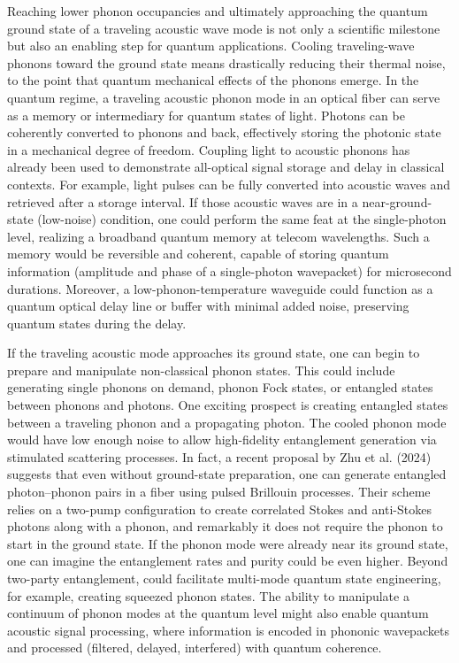 Reaching lower phonon occupancies and ultimately approaching the quantum ground state of a traveling acoustic wave mode is not only a scientific milestone but also an enabling step for quantum applications. Cooling traveling-wave phonons toward the ground state means drastically reducing their thermal noise, to the point that quantum mechanical effects of the phonons emerge. In the quantum regime, a traveling acoustic phonon mode in an optical fiber can serve as a memory or intermediary for quantum states of light. Photons can be coherently converted to phonons and back, effectively storing the photonic state in a mechanical degree of freedom. Coupling light to acoustic phonons has already been used to demonstrate all-optical signal storage and delay in classical contexts. For example, light pulses can be fully converted into acoustic waves and retrieved after a storage interval. \cite{merklein2017chip} If those acoustic waves are in a near-ground-state (low-noise) condition, one could perform the same feat at the single-photon level, realizing a broadband quantum memory at telecom wavelengths. Such a memory would be reversible and coherent, capable of storing quantum information (amplitude and phase of a single-photon wavepacket) for microsecond durations. \cite{merklein2017chip} Moreover, a low-phonon-temperature waveguide could function as a quantum optical delay line or buffer with minimal added noise, preserving quantum states during the delay.

If the traveling acoustic mode approaches its ground state, one can begin to prepare and manipulate non-classical phonon states. This could include generating single phonons on demand, phonon Fock states, or entangled states between phonons and photons. One exciting prospect is creating entangled states between a traveling phonon and a propagating photon. The cooled phonon mode would have low enough noise to allow high-fidelity entanglement generation via stimulated scattering processes. In fact, a recent proposal by Zhu et al. (2024) suggests that even without ground-state preparation, one can generate entangled photon–phonon pairs in a fiber using pulsed Brillouin processes. \cite{zhu2024optoacoustic} Their scheme relies on a two-pump configuration to create correlated Stokes and anti-Stokes photons along with a phonon, and remarkably it does not require the phonon to start in the ground state. If the phonon mode were already near its ground state, one can imagine the entanglement rates and purity could be even higher. Beyond two-party entanglement, could facilitate multi-mode quantum state engineering, for example, creating squeezed phonon states. \cite{hu1996squeezed} The ability to manipulate a continuum of phonon modes at the quantum level might also enable quantum acoustic signal processing, where information is encoded in phononic wavepackets and processed (filtered, delayed, interfered) with quantum coherence. \cite{manenti2017circuit}

